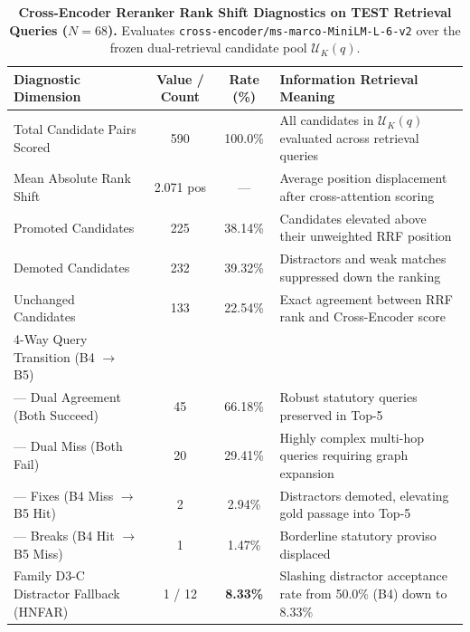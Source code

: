 \begin{table}[h]
\centering
\small
\begin{tabular}{lccl}
\toprule
\textbf{Diagnostic Dimension} & \textbf{Value / Count} & \textbf{Rate (\%)} & \textbf{Information Retrieval Meaning} \\
\midrule
Total Candidate Pairs Scored & 590 & 100.0\% & All candidates in $\mathcal{U}_K(q)$ evaluated across retrieval queries \\
Mean Absolute Rank Shift & 2.071 pos & --- & Average position displacement after cross-attention scoring \\
Promoted Candidates & 225 & 38.14\% & Candidates elevated above their unweighted RRF position \\
Demoted Candidates & 232 & 39.32\% & Distractors and weak matches suppressed down the ranking \\
Unchanged Candidates & 133 & 22.54\% & Exact agreement between RRF rank and Cross-Encoder score \\
\midrule
4-Way Query Transition (B4 $\to$ B5) & & & \\
--- Dual Agreement (Both Succeed) & 45 & 66.18\% & Robust statutory queries preserved in Top-5 \\
--- Dual Miss (Both Fail) & 20 & 29.41\% & Highly complex multi-hop queries requiring graph expansion \\
--- Fixes (B4 Miss $\to$ B5 Hit) & 2 & 2.94\% & Distractors demoted, elevating gold passage into Top-5 \\
--- Breaks (B4 Hit $\to$ B5 Miss) & 1 & 1.47\% & Borderline statutory proviso displaced \\
\midrule
Family D3-C Distractor Fallback (HNFAR) & 1 / 12 & \textbf{8.33\%} & Slashing distractor acceptance rate from 50.0\% (B4) down to 8.33\% \\
\bottomrule
\end{tabular}
\caption{\textbf{Cross-Encoder Reranker Rank Shift Diagnostics on TEST Retrieval Queries ($N=68$).} Evaluates \texttt{cross-encoder/ms-marco-MiniLM-L-6-v2} over the frozen dual-retrieval candidate pool $\mathcal{U}_K(q)$.}
\label{tab:reranker_diagnostics}
\end{table}

\vspace{1em}

